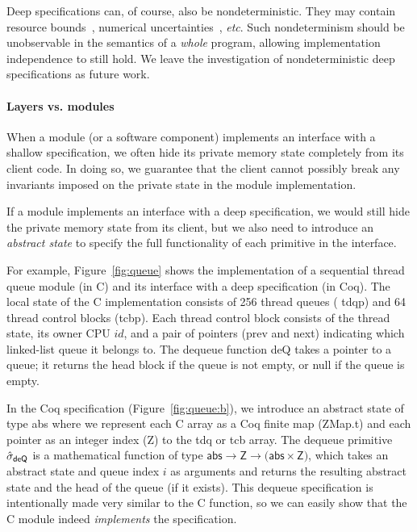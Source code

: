 Deep specifications can, of course, also be nondeterministic. They may
contain resource bounds~\cite{veristack}, numerical
uncertainties~\cite{chaudhuri10}, {\em etc}. Such nondeterminism should
be unobservable in the semantics of a {\em whole} program,
allowing implementation independence to still hold.  We leave the
investigation of nondeterministic deep specifications as future work.


\paragraph{Layers vs. modules} 
When a module (or a software component)
implements an interface with a shallow specification, 
we often hide its private memory state completely
from its client code. In doing so, we guarantee that the client
cannot possibly break any invariants imposed on the private state
in the module implementation.

If a module implements an interface with a deep specification, we
would still hide the private memory state from its client, but we also
need to introduce an {\em abstract state} to specify
the full functionality of each primitive in the interface. 

For example, Figure~\ref{fig:queue} shows the implementation of a
sequential thread queue module (in C) and its interface with a deep
specification (in Coq). The local state of the C implementation
consists of 256 thread queues (%
\textsf{tdqp}) and 64 thread control blocks
(\textsf{tcbp}).  Each thread control block consists of the thread state, its owner CPU $id$,
and a pair of pointers (\textsf{prev} and \textsf{next}) indicating which
linked-list queue it belongs to. The dequeue  function 
\textsf{deQ}
takes a pointer to a queue; it returns the head block if the queue
is not empty, or null if the queue is empty.

In the Coq specification (\cf Figure~\ref{fig:queue:b}), we introduce an abstract state
of type \textsf{abs} where we represent each C array as a Coq finite map
(\textsf{ZMap.t}) and each pointer as an integer index (\textsf{Z}) to the
\textsf{tdq} or \textsf{tcb} array. The dequeue primitive 
$\hat{\sigma}_\textsf{deQ}$ is
a mathematical function of type $\textsf{abs} \rightarrow \textsf{Z}
\rightarrow \textsf{(abs}\times \textsf{Z)}$,
which takes an abstract state and queue index $i$ as arguments
and returns the resulting abstract state and the head of the queue (if it exists).  This
dequeue specification is intentionally made very similar to the C
function, so we can easily show that the C module indeed {\em
  implements} the specification. 

